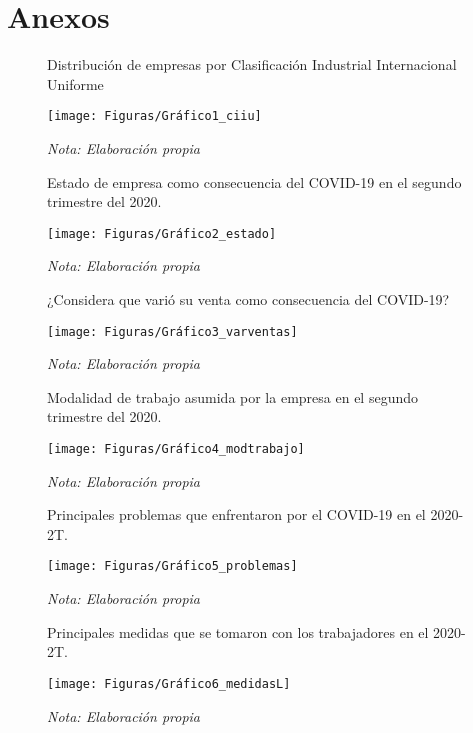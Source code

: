\documentclass[12pt]{article}
\begin{document}
        \newpage
        \section{Anexos}
            \begin{figure}[H]
                \centering
                \caption{Distribución de empresas por Clasificación Industrial Internacional Uniforme}
                \texttt{[image: Figuras/Gráfico1\_ciiu]}
                \caption*{\it Nota: Elaboración propia}
                \label{fig: ciiu}
            \end{figure}
            \begin{figure}[H]
                \centering
                \caption{Estado de empresa como consecuencia del COVID-19 en el segundo trimestre del 2020.}
                \texttt{[image: Figuras/Gráfico2\_estado]}
                \caption*{\it Nota: Elaboración propia}
                \label{fig: estado}
            \end{figure}
            \begin{figure}[H]
                \centering
                \caption{¿Considera que varió su venta como consecuencia del COVID-19?}
                \texttt{[image: Figuras/Gráfico3\_varventas]}
                \caption*{\it Nota: Elaboración propia}
                \label{fig: varventas}
            \end{figure}
            \begin{figure}[H]
                \centering
                \caption{Modalidad de trabajo asumida por la empresa en el segundo trimestre del 2020.}
                \texttt{[image: Figuras/Gráfico4\_modtrabajo]}
                \caption*{\it Nota: Elaboración propia}
                \label{fig: modtrabajo}
            \end{figure}
            \begin{figure}[H]
                \centering
                \caption{Principales problemas que enfrentaron por el COVID-19 en el 2020-2T.}
                \texttt{[image: Figuras/Gráfico5\_problemas]}
                \caption*{\it Nota: Elaboración propia}
                \label{fig: problemas}
            \end{figure}
            \begin{figure}[H]
                \centering
                \caption{Principales medidas que se tomaron con los trabajadores en el 2020-2T.}
                \texttt{[image: Figuras/Gráfico6\_medidasL]}
                \caption*{\it Nota: Elaboración propia}
                \label{fig: medidasL}
            \end{figure}
\end{document}
